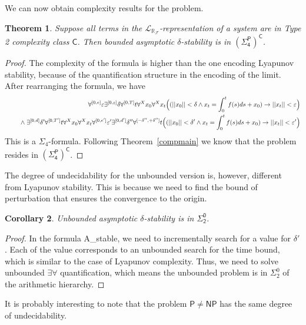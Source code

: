 \documentclass[12pt]{article}
\theoremstyle{plain}
\newtheorem{theorem}{Theorem}[section]
\newtheorem{corollary}[theorem]{Corollary}
\theoremstyle{definition}
\newcommand{\p}{\mathsf{P}}
\newcommand{\np}{\mathsf{NP}}
\newcommand{\lrf}{\mathcal{L}_{\mathbb{R}_{\mathcal{F}}}}
\begin{document}
We can now obtain complexity results for the problem.
\begin{theorem}
Suppose all terms in the $\lrf$-representation of a system are in Type 2 complexity class $\mathsf{C}$. Then bounded asymptotic $\delta$-stability is in $\mathsf{{(\Sigma_4^P)}^C}$.
\end{theorem}
\begin{proof}
The complexity of the formula is higher than the one encoding Lyapunov stability, because of the quantification structure in the encoding of the limit. After rearranging the formula, we have
\begin{eqnarray*}
& &\forall^{[0,e]} \varepsilon\exists^{[0,\varepsilon]} \delta\forall^{[0,T]} t\forall^X x_0\forall^X x_t\Big((||x_0||<\delta \wedge x_t = \int_0^t f(s)ds + x_0 )\rightarrow ||x_t||<\varepsilon\Big)\\
& &\hspace{.5cm}\wedge\; \exists^{[0,d]} \delta'  \forall^{[0,T']} t\forall^X x_0\forall^X x_t\forall^{[0,e']} \varepsilon' \exists^{[0,d']} \delta'' \forall^{[-\delta'',+\delta'']}t \Big( (||x_0||<\delta'\wedge x_t = \int_0^t f(s)ds + x_0 )\rightarrow ||x_t|| < \varepsilon'\Big)
\end{eqnarray*}
This is a $\Sigma_4$-formula. Following Theorem~\ref{compmain} we know that the problem resides in $\mathsf{{(\Sigma_4^P)}^C}$.
\end{proof}
The degree of undecidability for the unbounded version is, however, different from Lyapunov stability. This is because we need to find the bound of perturbation that ensures the convergence to the origin.
\begin{corollary}
Unbounded asymptotic $\delta$-stability is in $\mathsf{\Sigma^0_2}$.
\end{corollary}
\begin{proof}
In the formula {\sf A\_stable}, we need to incrementally search for a value for $\delta'$. Each of the value corresponds to an unbounded search for the time bound, which is similar to the case of Lyapunov complexity. Thus, we need to solve unbounded $\exists\forall$ quantification, which means the unbounded problem is in $\Sigma^0_2$ of the arithmetic hierarchy.
\end{proof}
It is probably interesting to note that the problem $\p\neq \np$ has the same degree of undecidability.
\end{document}
